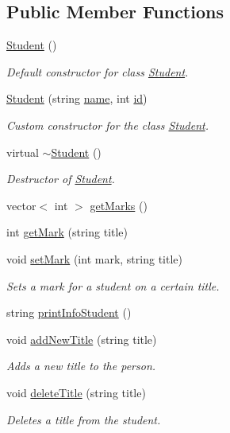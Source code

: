\subsection*{Public Member Functions}
\begin{DoxyCompactItemize}
\item 
\hyperlink{class_student_af9168cedbfa5565cf0b20c1a9d3f5c9d}{Student} ()
\begin{DoxyCompactList}\small\item\em Default constructor for class \hyperlink{class_student}{Student}. \end{DoxyCompactList}\item 
\hyperlink{class_student_afc317f470d694b6ef52387a4e21a1e08}{Student} (string \hyperlink{class_person_a669b64897b4d823a27bb5866368d4dfa}{name}, int \hyperlink{class_person_aec48a92f614a854ff380a15eb8e2f479}{id})
\begin{DoxyCompactList}\small\item\em Custom constructor for the class \hyperlink{class_student}{Student}. \end{DoxyCompactList}\item 
virtual \hyperlink{class_student_a71f6d37e021e98dff29ffe67bfac6ce1}{$\sim$\+Student} ()
\begin{DoxyCompactList}\small\item\em Destructor of \hyperlink{class_student}{Student}. \end{DoxyCompactList}\item 
vector$<$ int $>$ \hyperlink{class_student_aff1ed57b8df6e9a3a43a32dc99923b34}{get\+Marks} ()
\item 
int \hyperlink{class_student_a05a0feee9294d3502af003fb65e56adf}{get\+Mark} (string title)
\item 
void \hyperlink{class_student_ad197a15a65230e59d0a690a49738e9af}{set\+Mark} (int mark, string title)
\begin{DoxyCompactList}\small\item\em Sets a mark for a student on a certain title. \end{DoxyCompactList}\item 
string \hyperlink{class_student_a4b566cc6bf1a725ca1569f306046b16b}{print\+Info\+Student} ()
\item 
void \hyperlink{class_student_a616e34f2eebf885b3419bcd27e8f3840}{add\+New\+Title} (string title)
\begin{DoxyCompactList}\small\item\em Adds a new title to the person. \end{DoxyCompactList}\item 
void \hyperlink{class_student_a16d2a2c6abe8aa9ce53a2a15c4656eee}{delete\+Title} (string title)
\begin{DoxyCompactList}\small\item\em Deletes a title from the student. \end{DoxyCompactList}\end{DoxyCompactItemize}
